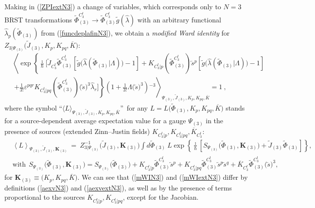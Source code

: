 \documentclass[10pt]{article}
\begin{document}
Making in (\ref{ZPIextN3}) a change of variables, which corresponds only to
$N=3$ BRST transformations $\widetilde{\Phi}_{(3)}^{C^t_3}\rightarrow\widetilde{\Phi}_{(3)}^{C^t_3} \tilde{g}(\hat{\lambda})$
with an arbitrary functional $\hat{\lambda}_{p}(\widetilde{\Phi}_{(3)}) $ from (\ref{funcdeplafinN3}), we obtain a \emph{modified
Ward identity} for $Z_{3|\Psi_{(3)}}\big(\widetilde{J}_{(3)},K_{p},  K_{pq}, \overline{K}\big)$:
\begin{align}
& \left\langle \exp\left\{ \frac{\imath}{\hbar}\Big[\widetilde{J}_{C^t_3}\widetilde{\Phi}^{C^t_3}_{(3)}\left[ \tilde{g}\big(\hat{\lambda}(\widetilde{\Phi}_{(3)}|\Lambda)\big)-1\right]+  K_{C^t_3|p} (\widetilde{\Phi}_{(3)}^{C^t_3}) \overleftarrow{s}{}^p\left[ \tilde{g}\big(\hat{\lambda}(\widetilde{\Phi}_{(3)}|\Lambda)\big)-1\right]  \right.\right.\nonumber \\
& \ \left.\left.+ \frac{1}{3!}\varepsilon^{pqr}K_{C^t_3|pq} (\widetilde{\Phi}_{(3)}^{C^t_3}) \big(\overleftarrow{s}\big)^3\hat{\lambda}_r\Big]\right\}  \left(  1+\frac{1}{3!}\Lambda\big(\overleftarrow
{s}\big)^{3}\right)  {}^{-3}\right\rangle _{\Psi_{(3)},\widetilde{J}_{(3)},K_p, K_{pq}, \overline{K}} =1\ ,\label{mWIextN3}%
\end{align}
where the symbol \textquotedblleft$\langle{L}\rangle_{\Psi_{(3)},\widetilde{J}_{(3)},K_p, K_{pq}, \overline{K}}$\textquotedblright\ for any ${L}%
=L\big(\widetilde{\Phi}_{(3)}, K_p, K_{pq}, \overline{K}\big)$ stands for a source-dependent average expectation value
for a gauge $\Psi_{(3)}$ in the presence of sources (extended Zinn--Justin fields)
$K_{C_3^t|p},  K_{C_3^t|pq}, \overline{K}_{C^t_3}$:
\begin{align}
& \left\langle L\right\rangle _{\Psi_{(3)},\widetilde{J}_{(3)},\mathbf{K}_{(3)}}  \  =\ Z_{3|\Psi_{(3)}}^{-1}\big(\widetilde{J}_{(3)},\mathbf{K}_{(3)}\big)
\int d\widetilde{\Phi}_{(3)}\ L\exp\left\{  \frac{\imath}{\hbar}\left[ {S}_{\Psi_{(3)}}(\widetilde{\Phi}_{(3)},\mathbf{K}_{(3)}\big) %
+\widetilde{J}_{(3)}\widetilde{\Phi}_{(3)}\right]
\right\}  ,\label{aexvextN3}\\
& \mathrm{with}\ \ {S}_{\Psi_{(3)}}\big(\widetilde{\Phi}_{(3)},\mathbf{K}_{(3)}\big) ={S}_{\Psi_{(3)}}\big(\widetilde{\Phi}_{(3)}\big)+  K_{C^t_3|p} \widetilde{\Phi}_{(3)}^{C^t_3}\overleftarrow{s}{}^p + K_{C^t_3|pq} \widetilde{\Phi}_{(3)}^{C^t_3} \overleftarrow{s}{}^p\overleftarrow{s}{}^q  + \overline{K}_{C^t_3}  \widetilde{\Phi}_{(3)}^{C^t_3} \big(\overleftarrow{s}\big)^3 ,
\nonumber
\end{align}
for $\mathbf{K}_{(3)}\equiv \big(K_p, K_{pq}, \overline{K}\big)$. We can see that (\ref{mWIN3}) and (\ref{mWIextN3}) differ by definitions
(\ref{aexvN3}) and (\ref{aexvextN3}), as well as by the presence of terms
proportional to the sources $K_{C^t_3|p}, K_{C^t_3|pq}$, except for the Jacobian.
\end{document}
